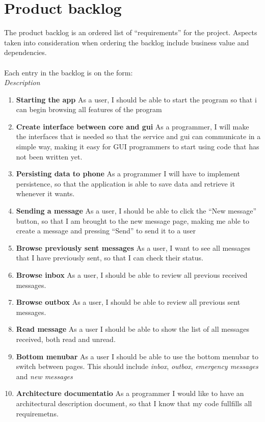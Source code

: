 \chapter{Product backlog}
The product backlog is an ordered list of ``requirements'' for the project. Aspects taken into consideration when ordering the backlog include business value and dependencies.\\\\
		Each entry in the backlog is on the form:\\
			 {\it Description}
		
		\begin{enumerate}
			\item {\bf Starting the app} As a user, I should be able to start the program so that i can begin browsing all features of the program
			\item {\bf Create interface between core and gui} As a programmer, I will make the interfaces that is needed so that the service and gui can communicate in a simple way, making it easy for GUI programmers to start using code that has not been written yet.
			\item {\bf Persisting data to phone} As a programmer I will have to implement persistence, so that the application is able to save data and retrieve it whenever it wants.
			\item {\bf Sending a message} As a user, I should be able to click the ``New message'' button, so that I am brought to the new message page, making me able to create a message and pressing ``Send'' to send it to a user
			\item {\bf Browse previously sent messages} As a user, I want to see all messages that I have previously sent, so that I can check their status.
			\item {\bf Browse inbox} As a user, I should be able to review all previous received messages.
			\item {\bf Browse outbox} As a user, I should be able to review all previous sent messages.
			\item {\bf{Read message}} As a user I should be able to show the list of all messages received, both read and unread.
			\item {\bf Bottom menubar} As a user I should be able to use the bottom menubar to switch between pages. This should include {\it inbox}, {\it outbox}, {\it emergency messages} and {\it new messages}
			\item {\bf Architecture documentatio} As a programmer I would like to have an architectural description document, so that I know that my code fullfills all requiremetns.

\end{enumerate}
